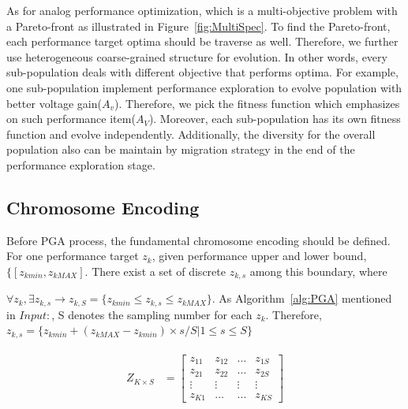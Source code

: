       As for analog performance optimization, which is a multi-objective problem with a Pareto-front as illustrated in Figure~\ref{fig:MultiSpec}. To find the Pareto-front, each performance target optima should be traverse as well. Therefore, we further use heterogeneous coarse-grained structure for evolution. In other words, every sub-population deals with different objective that performs optima. For example, one sub-population implement performance exploration to evolve population with better voltage gain($A_v$). Therefore, we pick the fitness function which emphasizes on such performance item($A_V$). Moreover, each sub-population has its own fitness function and evolve independently. Additionally, the diversity for the overall population also can be maintain by migration strategy in the end of the performance exploration stage.

    \subsection{Chromosome Encoding}

      Before PGA process, the fundamental chromosome encoding should be defined. For one performance target $z_k$, given performance upper and lower bound, $\{\left [z_{kmin},z_{kMAX} \right]$. There exist a set of discrete $z_{k,s}$ among this boundary, where 
      \begin{defi}\label{def:Z}
        $\forall z_k, \exists z_{k,s} \to z_{k,S} = \{z_{kmin} \leq z_{k,s} \leq z_{kMAX}\}$. As Algorithm~\ref{alg:PGA} mentioned in $Input:$, S denotes the sampling number for each $z_k$. Therefore, $z_{k,s} = \{z_{kmin} + ({z_{kMAX}-z_{kmin}})\times s/S | 1 \leq s \leq S\}$
      \end{defi}

      \begin{align}\label{eq:PerfMatrix}
        \begin{array}{rl}
          Z_{K \times S} & = 
              \left[\begin{array}{cccc}
               z_{11} & z_{12} & \dots  & z_{1S} \\
               z_{21} & z_{22} & \dots  & z_{2S} \\
               \vdots & \vdots & \vdots & \vdots  \\
               z_{K1} & \dots  & \dots  & z_{KS} 
            \end{array}\right]
        \end{array}
      \end{align}
   
